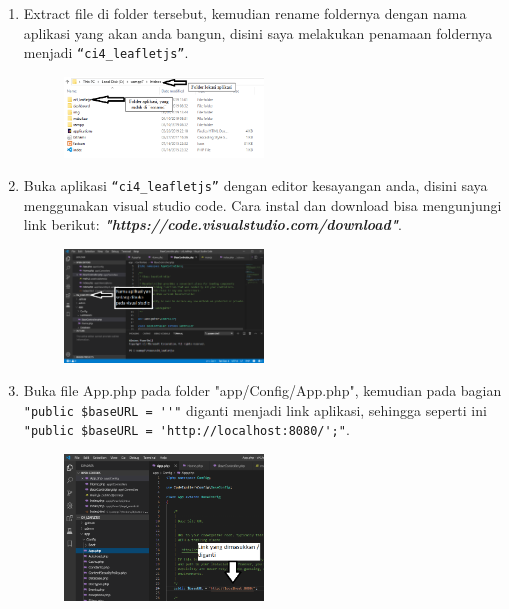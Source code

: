 \begin{enumerate}
		\item Extract file di folder tersebut, kemudian rename foldernya dengan nama aplikasi yang akan anda bangun, disini saya melakukan penamaan foldernya menjadi \verb|“ci4_leafletjs”|.
		\begin{figure}[!htbp]
    		\centering
    		\includegraphics[width=0.5\textwidth]{figures/CODEIGNITER4/CI3.PNG}
    		\label{CodeIgniter3}
		\end{figure}
		
		\item Buka aplikasi \verb|“ci4_leafletjs”| dengan editor kesayangan anda, disini saya menggunakan visual studio code. Cara instal dan download bisa mengunjungi link berikut: \textbf{\textit{"https://code.visualstudio.com/download"}}.
		\begin{figure}[!htbp]
    		\centering
    		\includegraphics[width=0.5\textwidth]{figures/CODEIGNITER4/CI4.PNG}
    		\label{CodeIgniter4}
		\end{figure}
		
		\item Buka file App.php pada folder "app/Config/App.php", kemudian pada bagian \verb|"public $baseURL = ''"| diganti menjadi link aplikasi, sehingga seperti ini \verb|"public $baseURL = 'http://localhost:8080/';"|.
		\begin{figure}[!htbp]
    		\centering
    		\includegraphics[width=0.5\textwidth]{figures/CODEIGNITER4/CI5.PNG}
    		\label{CodeIgniter5}
		\end{figure}
		

\end{enumerate}

